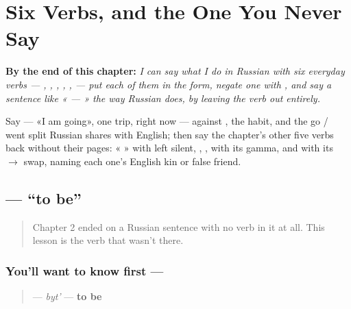 
\chapter{Six Verbs, and the One You Never Say}
\label{ch:russian-first-verbs}

\begin{chapteropening}
\textbf{By the end of this chapter:} \emph{I can say what I do in Russian with six everyday verbs — , , , , ,  — put each of them in the  form, negate one with , and say a sentence like « — » the way Russian does, by leaving the verb out entirely.}

Say  — «I am going», one trip, right now — against , the habit, and the go / went split Russian shares with English; then say the chapter's other five verbs back without their pages: « » with  left silent, ,  ,  with its gamma, and  with its $\to$ swap, naming each one's English kin or false friend.
\end{chapteropening}

\section[\texorpdfstring{\ru{быть} (byt')}{быть (byt')}]{ — \textquotedblleft{}to be\textquotedblright{}}

\label{lesson:RU-C03-byt}



\begin{quote}
Chapter 2 ended on a Russian sentence with no verb in it at all. This lesson is the verb that wasn't there.
\end{quote}

\subsection*{You'll want to know first — }
\begin{quote}
\textbf{} — \emph{byt'} — \textbf{to be}
\end{quote}

